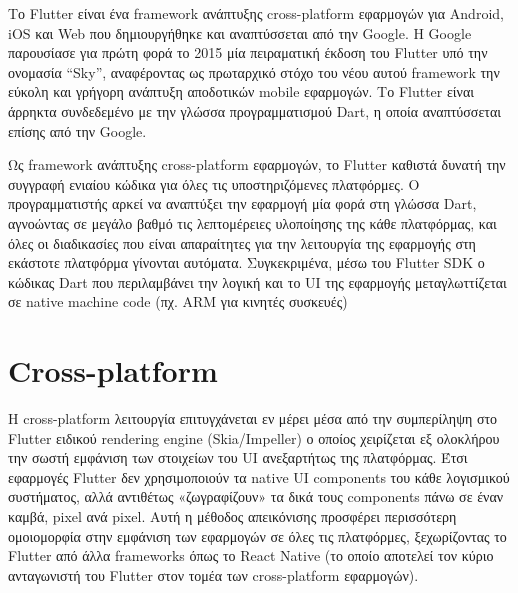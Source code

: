 \documentclass[../thesis.tex]{subfiles}
\begin{document}
Το Flutter είναι ένα framework ανάπτυξης cross-platform εφαρμογών για Android, iOS και Web που δημιουργήθηκε και αναπτύσσεται από την Google.
Η Google παρουσίασε για πρώτη φορά το 2015 μία πειραματική έκδοση του Flutter υπό την ονομασία “Sky”, αναφέροντας ως πρωταρχικό στόχο του νέου αυτού framework την εύκολη και γρήγορη ανάπτυξη αποδοτικών mobile εφαρμογών.
Το Flutter είναι άρρηκτα συνδεδεμένο με την γλώσσα προγραμματισμού Dart, η οποία αναπτύσσεται επίσης από την Google.

Ως framework ανάπτυξης cross-platform εφαρμογών, το Flutter καθιστά δυνατή την συγγραφή ενιαίου κώδικα για όλες τις υποστηριζόμενες πλατφόρμες.
Ο προγραμματιστής αρκεί να αναπτύξει την εφαρμογή μία φορά στη γλώσσα Dart,
αγνοώντας σε μεγάλο βαθμό τις λεπτομέρειες υλοποίησης της κάθε πλατφόρμας,
και όλες οι διαδικασίες που είναι απαραίτητες για την λειτουργία της εφαρμογής στη εκάστοτε πλατφόρμα γίνονται αυτόματα.
Συγκεκριμένα, μέσω του Flutter SDK ο κώδικας Dart που περιλαμβάνει την λογική και το UI της εφαρμογής μεταγλωττίζεται σε native machine code (πχ. ARM για κινητές συσκευές)

\section{Cross-platform}
Η cross-platform λειτουργία επιτυγχάνεται εν μέρει μέσα από την συμπερίληψη στο Flutter ειδικού rendering engine (Skia/Impeller) ο οποίος χειρίζεται εξ ολοκλήρου την σωστή εμφάνιση των στοιχείων του UI ανεξαρτήτως της πλατφόρμας.
Έτσι εφαρμογές Flutter δεν χρησιμοποιούν τα native UI components του κάθε λογισμικού συστήματος, αλλά αντιθέτως «ζωγραφίζουν» τα δικά τους components πάνω σε έναν καμβά, pixel ανά pixel.
Αυτή η μέθοδος απεικόνισης προσφέρει περισσότερη ομοιομορφία στην εμφάνιση των εφαρμογών σε όλες τις πλατφόρμες, ξεχωρίζοντας το Flutter από άλλα frameworks όπως το React Native (το οποίο αποτελεί τον κύριο ανταγωνιστή του Flutter στον τομέα των cross-platform εφαρμογών).
\end{document}

